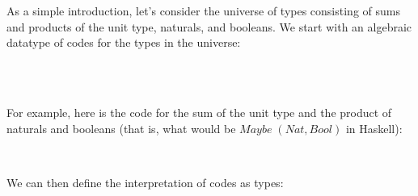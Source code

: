 \documentclass[fleqn,runningheads]{llncs}
\begin{document}
As a simple introduction, let's consider the universe of types consisting of sums and products of the unit type, naturals, and booleans. We start with an algebraic datatype of codes for the types in the universe:
\begin{code}%
\>[0]\AgdaSpace{}%
\AgdaSpace{}%
\AgdaSymbol{:}\AgdaSpace{}%
\AgdaSpace{}%
\<%
\\
\>[0][@{}l@{\AgdaIndent{0}}]%
\>[2]\AgdaSpace{}%
\AgdaSpace{}%
\AgdaSpace{}%
\AgdaSymbol{:}\AgdaSpace{}%
\<%
\\
%
\>[2]\AgdaOperator{\AgdaInductiveConstructor{\AgdaUnderscore{}*\AgdaUnderscore{}}}%
\>[8]\AgdaOperator{\AgdaInductiveConstructor{\AgdaUnderscore{}+\AgdaUnderscore{}}}%
\>[14]\AgdaSymbol{:}\AgdaSpace{}%
\AgdaSpace{}%
\AgdaSpace{}%
\AgdaSpace{}%
\AgdaSpace{}%
\<%
\end{code}
For example, here is the code for the sum of the unit type and the product of naturals and booleans (that is, what would be $\mathit{Maybe}\;(\mathit{Nat},\mathit{Bool})$ in Haskell):
\begin{code}%
\>[0]\AgdaSpace{}%
\AgdaSymbol{:}\AgdaSpace{}%
\<%
\\
\>[0]\AgdaSpace{}%
\AgdaSymbol{=}\AgdaSpace{}%
\AgdaSpace{}%
\AgdaOperator{\AgdaInductiveConstructor{+}}\AgdaSpace{}%
\AgdaSymbol{(}\AgdaSpace{}%
\AgdaOperator{\AgdaInductiveConstructor{*}}\AgdaSpace{}%
\AgdaSymbol{)}\<%
\end{code}
We can then define the interpretation of codes as types:
\end{document}
